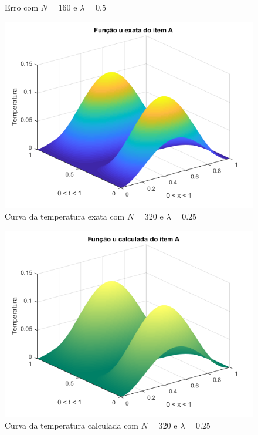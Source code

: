 \documentclass[12pt]{article}
\begin{document}
\begin{spacing}{1.5}
\begin{figure}
    \caption{Erro com $N=160$ e $\lambda=0.5$}
    \label{fig:A_n160lambda0-5_erro}
\end{figure}


\begin{figure}
    \centering
    \includegraphics[width=0.8\linewidth]{Primeira_Tarefa/ItemA/n320_lambda0-25_exata.png}
    \caption{Curva da temperatura exata com $N=320$ e $\lambda=0.25$}
    \label{fig:A_n320lambda0-25_exata}
\end{figure}
\begin{figure}
    \centering
    \includegraphics[width=0.8\linewidth]{Primeira_Tarefa/ItemA/n320_lambda0-25_calc.png}
    \caption{Curva da temperatura calculada com $N=320$ e $\lambda=0.25$}
    \label{fig:A_n320lambda0-25_calc}
\end{figure}
\begin{figure}
    \centering

\end{figure}
\end{spacing}
\end{document}
